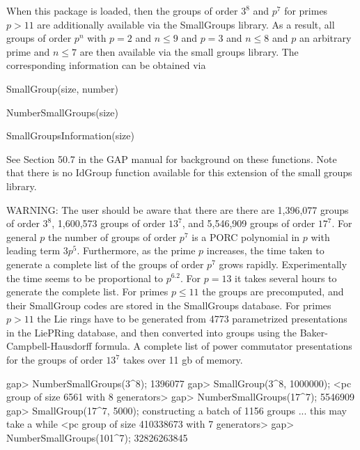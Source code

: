 

When this package is loaded, then the groups of order $3^8$ and $p^7$ for 
primes $p > 11$ are additionally available via the SmallGroups library. As 
a result, all groups of order $p^n$ with $p=2$ and $n \leq 9$ and $p=3$ and 
$n \leq 8$ and $p$ an arbitrary prime and $n \leq 7$ are then available via 
the small groups library. The corresponding information can be obtained via 

\>SmallGroup(size, number)

\>NumberSmallGroups(size)

\>SmallGroupsInformation(size)

See Section 50.7 in the GAP manual for background on these functions. Note
that there is no IdGroup function available for this extension of the small
groups library.

WARNING: The user should be aware that there are there are 1,396,077 groups
of order $3^8$, 1,600,573 groups of order $13^{7}$, and 5,546,909 groups
of order $17^7$. For general $p$ the number of groups of order $p^7$ is 
a PORC polynomial in $p$ with leading term $3p^5$. Furthermore, as the prime
$p$ increases, the time taken to generate a complete list of the groups of 
order $p^7$ grows rapidly. Experimentally the time seems to be proportional
to $p^{6.2}$. For $p=13$ it takes several hours to generate the complete 
list. For primes $p\leq 11$ the groups are precomputed, and their SmallGroup 
codes are stored in the SmallGroups database. For primes $p>11$ the Lie rings 
have to be generated from 4773 parametrized presentations in the LiePRing 
database, and then converted into groups using the Baker-Campbell-Hausdorff 
formula. A complete list of power commutator presentations for the groups 
of order $13^7$ takes over 11 gb of memory.

\beginexample
gap> NumberSmallGroups(3^8);
1396077
gap> SmallGroup(3^8, 1000000);
<pc group of size 6561 with 8 generators>
gap> NumberSmallGroups(17^7);
5546909
gap> SmallGroup(17^7, 5000);
constructing a batch of 1156 groups ... this may take a while 
<pc group of size 410338673 with 7 generators>
gap> NumberSmallGroups(101^7);
32826263845
\endexample

